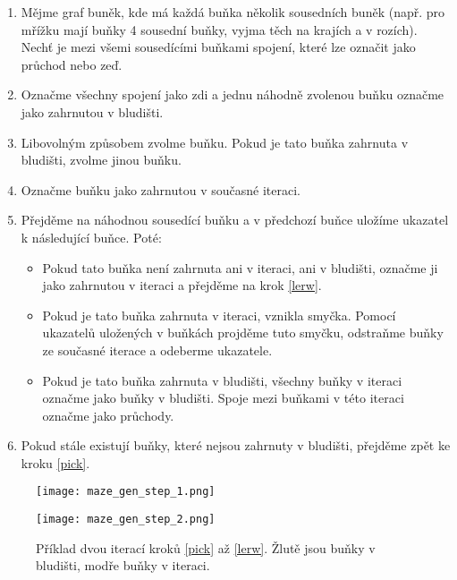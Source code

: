 \begin{enumerate}
  \setcounter{enumi}{0}
  \item Mějme graf buněk, kde má každá buňka několik sousedních buněk (např. pro mřížku mají buňky 4 sousední buňky, vyjma těch na krajích a v rozích). Nechť je mezi všemi sousedícími buňkami spojení, které lze označit jako průchod nebo zeď.
  \item Označme všechny spojení jako zdi a jednu náhodně zvolenou buňku označme jako zahrnutou v bludišti. \label{init}
  \item Libovolným způsobem zvolme buňku. Pokud je tato buňka zahrnuta v bludišti, zvolme jinou buňku. \label{pick}
  \item Označme buňku jako zahrnutou v současné iteraci.
  \item Přejděme na náhodnou sousedící buňku a v předchozí buňce uložíme ukazatel k následující buňce. Poté: \label{lerw}
        \begin{itemize}
          \item Pokud tato buňka není zahrnuta ani v iteraci, ani v bludišti, označme ji jako zahrnutou v iteraci a přejděme na krok \ref{lerw}.
          \item Pokud je tato buňka zahrnuta v iteraci, vznikla smyčka. Pomocí ukazatelů uložených v buňkách projděme tuto smyčku, odstraňme buňky ze současné iterace a odeberme ukazatele.
          \item Pokud je tato buňka zahrnuta v bludišti, všechny buňky v iteraci označme jako buňky v bludišti. Spoje mezi buňkami v této iteraci označme jako průchody.
        \end{itemize}
  \item Pokud stále existují buňky, které nejsou zahrnuty v bludišti, přejděme zpět ke kroku \ref{pick}.
\end{enumerate}

\begin{figure}[H]
  \centering

  \begin{minipage}{.5\textwidth}
    \centering
    \texttt{[image: maze\_gen\_step\_1.png]}
  \end{minipage}%
  \begin{minipage}{.5\textwidth}
    \centering
    \texttt{[image: maze\_gen\_step\_2.png]}
  \end{minipage}

  \caption{Příklad dvou iterací kroků \ref{pick} až \ref{lerw}. Žlutě jsou buňky v bludišti, modře buňky v iteraci.}
\end{figure}

